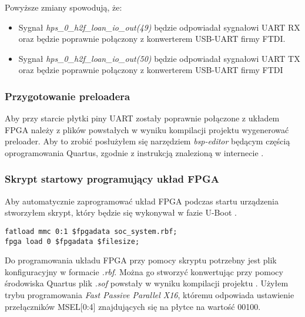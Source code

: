 Powyższe zmiany spowodują, że:
\begin{itemize}[noitemsep]
\item Sygnał \textit{hps\_0\_h2f\_loan\_io\_out(49)} będzie odpowiadał sygnałowi UART RX oraz będzie poprawnie połączony z konwerterem USB-UART firmy FTDI.
\item Sygnał \textit{hps\_0\_h2f\_loan\_io\_out(50)} będzie odpowiadał sygnałowi UART TX oraz będzie poprawnie połączony z konwerterem USB-UART firmy FTDI
\end{itemize}

\subsubsection{Przygotowanie preloadera}
Aby przy starcie płytki piny UART zostały poprawnie połączone z układem FPGA należy z plików powstałych w wyniku kompilacji projektu wygenerować preloader. Aby to zrobić posłużyłem się narzędziem \textit{bsp-editor} będącym częścią oprogramowania Quartus, zgodnie z instrukcją znalezioną w internecie \cite{rocketboards-preloader}.

\subsubsection{Skrypt startowy programujący układ FPGA}
Aby automatycznie zaprogramować układ FPGA podczas startu urządzenia stworzyłem skrypt, który będzie się wykonywał w fazie U-Boot \cite{rocketboards-uboot-script}.
\begin{lstlisting}
fatload mmc 0:1 $fpgadata soc_system.rbf;
fpga load 0 $fpgadata $filesize;
\end{lstlisting}
Do programowania układu FPGA przy pomocy skryptu potrzebny jest plik konfiguracyjny w formacie \textit{.rbf}. Można go stworzyć konwertując przy pomocy środowiska Quartus plik \textit{.sof} powstały w wyniku kompilacji projektu \cite{rocketboards-sof-to-rfb}. Użyłem trybu programowania \textit{Fast Passive Parallel X16}, któremu odpowiada ustawienie przełączników MSEL[0:4] znajdujących się na płytce na wartość 00100.

